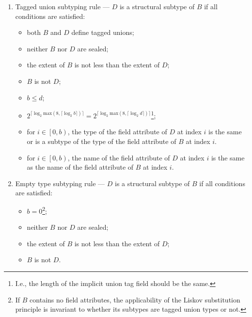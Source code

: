 \begin{enumerate}
    \item Tagged union subtyping rule --- $D$ is a structural subtype of $B$ if all conditions are satisfied:
    \begin{itemize}
        \item both $B$ and $D$ define tagged unions;
        \item neither $B$ nor $D$ are sealed;
        \item the extent of $B$ is not less than the extent of $D$;
        \item $B$ is not $D$;
        \item $b \leq d$;
        \item $2^{\lceil\log_2 \text{max}\left(8, \lceil\log_2 b\rceil\right)\rceil} =
               2^{\lceil\log_2 \text{max}\left(8, \lceil\log_2 d\rceil\right)\rceil}$\footnote{%
            I.e., the length of the implicit union tag field should be the same.
        };
        \item for $i \in \left[0, b\right)$, the type of the field attribute of $D$ at index $i$
        is the same or is a subtype of the type of the field attribute of $B$ at index $i$.
        \item for $i \in \left[0, b\right)$, the name of the field attribute of $D$ at index $i$
        is the same as the name of the field attribute of $B$ at index $i$.
    \end{itemize}

    \item Empty type subtyping rule --- $D$ is a structural subtype of $B$ if all conditions are satisfied:
    \begin{itemize}
        \item $b = 0$\footnote{%
            If $B$ contains no field attributes, the applicability of the Liskov substitution principle is invariant to
            whether its subtypes are tagged union types or not.
        };
        \item neither $B$ nor $D$ are sealed;
        \item the extent of $B$ is not less than the extent of $D$;
        \item $B$ is not $D$.
    \end{itemize}
\end{enumerate}

